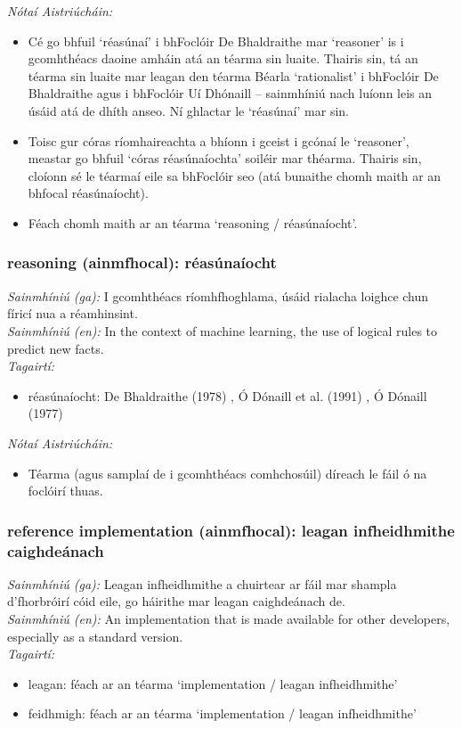  \noindent \textit{Nótaí Aistriúcháin:}
\begin{itemize}
	\item Cé go bhfuil `réasúnaí' i bhFoclóir De Bhaldraithe mar `reasoner' is i gcomhthéacs daoine amháin atá an téarma sin luaite. Thairis sin, tá an téarma sin luaite mar leagan den téarma Béarla `rationalist' i bhFoclóir De Bhaldraithe agus i bhFoclóir Uí Dhónaill -- sainmhíniú nach luíonn leis an úsáid atá de dhíth anseo. Ní ghlactar le `réasúnaí' mar sin.
	\item Toisc gur córas ríomhaireachta a bhíonn i gceist i gcónaí le `reasoner', meastar go bhfuil `córas réasúnaíochta' soiléir mar théarma. Thairis sin, cloíonn sé le téarmaí eile sa bhFoclóir seo (atá bunaithe chomh maith ar an bhfocal réasúnaíocht).
	\item Féach chomh maith ar an téarma `reasoning / réasúnaíocht'.
\end{itemize}


\subsubsection*{reasoning (ainmfhocal): réasúnaíocht}
 \noindent \textit{Sainmhíniú (ga):} I gcomhthéacs ríomhfhoghlama, úsáid rialacha loighce chun fíricí nua a réamhinsint.
\\
 \noindent \textit{Sainmhíniú (en):} In the context of machine learning, the use of logical rules to predict new facts.
\\
 \noindent \textit{Tagairtí:}
\begin{itemize}
	\item réasúnaíocht: De Bhaldraithe (1978) \cite{de-bhaldraithe}, Ó Dónaill et al. (1991) \cite{focloir-beag}, Ó Dónaill (1977) \cite{odonaill}
\end{itemize}

 \noindent \textit{Nótaí Aistriúcháin:}
\begin{itemize}
	\item Téarma (agus samplaí de i gcomhthéacs comhchosúil) díreach le fáil ó na foclóirí thuas.
\end{itemize}


\subsubsection*{reference implementation (ainmfhocal): leagan infheidhmithe caighdeánach}
 \noindent \textit{Sainmhíniú (ga):} Leagan infheidhmithe a chuirtear ar fáil mar shampla d'fhorbróirí cóid eile, go háirithe mar leagan caighdeánach de.
\\
 \noindent \textit{Sainmhíniú (en):} An implementation that is made available for other developers, especially as a standard version.
\\
 \noindent \textit{Tagairtí:}
\begin{itemize}
	\item leagan: féach ar an téarma `implementation / leagan infheidhmithe'
	\item feidhmigh: féach ar an téarma `implementation / leagan infheidhmithe'
\end{itemize}

